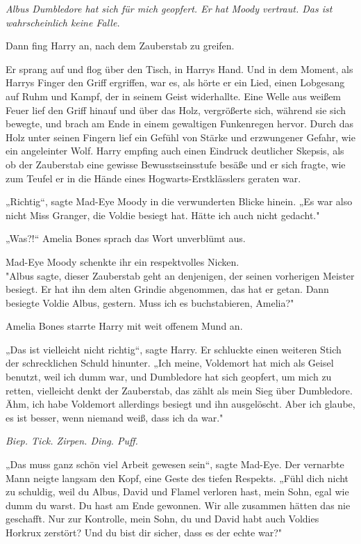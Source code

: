 {\emph{Albus Dumbledore hat sich für mich geopfert. Er hat Moody vertraut. Das ist wahrscheinlich keine Falle.}

Dann fing Harry an, nach dem Zauberstab zu greifen.

Er sprang auf und flog über den Tisch, in Harrys Hand. Und in dem Moment, als Harrys Finger den Griff ergriffen, war es, als hörte er ein Lied, einen Lobgesang auf Ruhm und Kampf, der in seinem Geist widerhallte. Eine Welle aus weißem Feuer lief den Griff hinauf und über das Holz, vergrößerte sich, während sie sich bewegte, und brach am Ende in einem gewaltigen Funkenregen hervor. Durch das Holz unter seinen Fingern lief ein Gefühl von Stärke und erzwungener Gefahr, wie ein angeleinter Wolf. Harry empfing auch einen Eindruck deutlicher Skepsis, als ob der Zauberstab eine gewisse Bewusstseinsstufe besäße und er sich fragte, wie zum Teufel er in die Hände eines Hogwarts-Erstklässlers geraten war.

„Richtig“, sagte Mad-Eye Moody in die verwunderten Blicke hinein. „Es war also nicht Miss Granger, die Voldie besiegt hat. Hätte ich auch nicht gedacht."

„Was?!“ Amelia Bones sprach das Wort unverblümt aus.

Mad-Eye Moody schenkte ihr ein respektvolles Nicken.\\ "Albus sagte, dieser Zauberstab geht an denjenigen, der seinen vorherigen Meister besiegt. Er hat ihn dem alten Grindie abgenommen, das hat er getan. Dann besiegte Voldie Albus, gestern. Muss ich es buchstabieren, Amelia?"

Amelia Bones starrte Harry mit weit offenem Mund an.

„Das ist vielleicht nicht richtig“, sagte Harry. Er schluckte einen weiteren Stich der schrecklichen Schuld hinunter. „Ich meine, Voldemort hat mich als Geisel benutzt, weil ich dumm war, und Dumbledore hat sich geopfert, um mich zu retten, vielleicht denkt der Zauberstab, das zählt als mein Sieg über Dumbledore. Ähm, ich habe Voldemort allerdings besiegt und ihn ausgelöscht. Aber ich glaube, es ist besser, wenn niemand weiß, dass ich da war."

\emph{Biep. Tick. Zirpen. Ding. Puff.}

„Das muss ganz schön viel Arbeit gewesen sein“, sagte Mad-Eye. Der vernarbte Mann neigte langsam den Kopf, eine Geste des tiefen Respekts. „Fühl dich nicht zu schuldig, weil du Albus, David und Flamel verloren hast, mein Sohn, egal wie dumm du warst. Du hast am Ende gewonnen. Wir alle zusammen hätten das nie geschafft. Nur zur Kontrolle, mein Sohn, du und David habt auch Voldies Horkrux zerstört? Und du bist dir sicher, dass es der echte war?"

}
